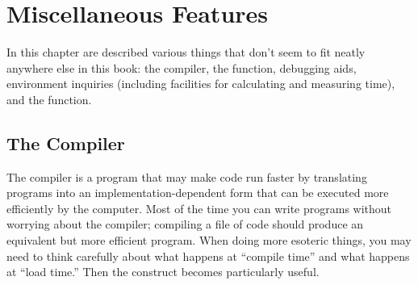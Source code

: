 
\clearpage\def\pagestatus{FINAL PROOF}

\chapter{Miscellaneous Features}

In this chapter are described various things that don't
seem to fit neatly anywhere else in this book:
the compiler, the 
function, debugging aids, environment inquiries (including facilities
for calculating and measuring time), and the  function.


\section{The Compiler}
\label{COMPILER-SECTION} 

The compiler is a program that may make code run faster by translating
programs into an implementation-dependent form that can
be executed more efficiently by the computer.  Most of the time
you can write programs without worrying about the compiler;
compiling a file of code should produce an equivalent but more
efficient program.  When doing more esoteric things, you may need to
think carefully about what happens at ``compile time'' and what happens
at ``load time.''  Then the  construct
becomes particularly useful.



